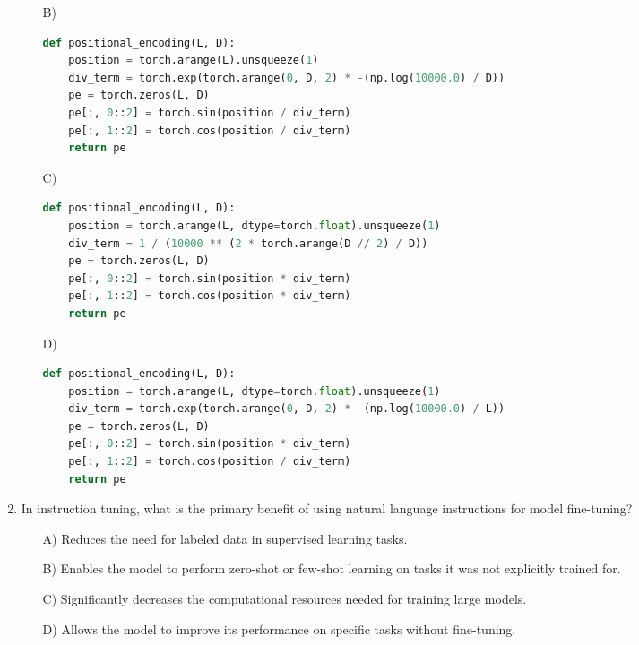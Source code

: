 \documentclass[10pt]{article}
\begin{document}
\begin{enumerate}
\begin{itemize}
\item[B)] 
\begin{lstlisting}[language=Python]
def positional_encoding(L, D):
    position = torch.arange(L).unsqueeze(1)
    div_term = torch.exp(torch.arange(0, D, 2) * -(np.log(10000.0) / D))
    pe = torch.zeros(L, D)
    pe[:, 0::2] = torch.sin(position / div_term)
    pe[:, 1::2] = torch.cos(position / div_term)
    return pe
\end{lstlisting}



\item[C)] 
\begin{lstlisting}[language=Python]
def positional_encoding(L, D):
    position = torch.arange(L, dtype=torch.float).unsqueeze(1)
    div_term = 1 / (10000 ** (2 * torch.arange(D // 2) / D))
    pe = torch.zeros(L, D)
    pe[:, 0::2] = torch.sin(position * div_term)
    pe[:, 1::2] = torch.cos(position * div_term)
    return pe
\end{lstlisting}



\item[D)] 
\begin{lstlisting}[language=Python]
def positional_encoding(L, D):
    position = torch.arange(L, dtype=torch.float).unsqueeze(1)
    div_term = torch.exp(torch.arange(0, D, 2) * -(np.log(10000.0) / L))
    pe = torch.zeros(L, D)
    pe[:, 0::2] = torch.sin(position * div_term)
    pe[:, 1::2] = torch.cos(position / div_term)
    return pe
\end{lstlisting}
        
\end{itemize}



\item In instruction tuning, what is the primary benefit of using natural language instructions for model fine-tuning?
    \begin{itemize}
        \item[A)] Reduces the need for labeled data in supervised learning tasks.
        \item[B)] Enables the model to perform zero-shot or few-shot learning on tasks it was not explicitly trained for.
        \item[C)] Significantly decreases the computational resources needed for training large models.
        \item[D)] Allows the model to improve its performance on specific tasks without fine-tuning.
    \end{itemize}



\end{enumerate}
\end{document}
